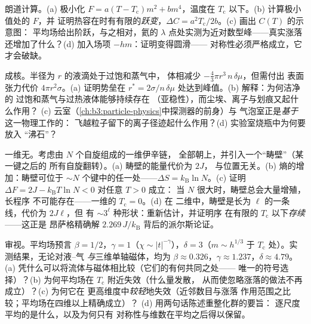 \begin{exercise}[$\star\star$]\label{exo:b3:phase-transitions:8}
朗道计算。(a) 极小化 $F = a(T - T_{\text{c}})m^2 +
bm^4$，温度在 $T_{\text{c}}$ 以下。(b) 计算极小值处的 $F$，并
证明热容在时有有限的\emph{跃变}，$\Delta C =
a^2T_{\text{c}}/2b$。(c) 画出 $C(T)$ 的示意图：
平均场给出阶跃，与之相对，氦的
$\lambda$ 点处实测为近对数型峰——真实涨落还增加了什么？(d)
加入场项 $-hm$：证明变得圆滑——
对称性必须严格成立，它才会破缺。
\end{exercise}

\begin{exercise}[$\star\star$]\label{exo:b3:phase-transitions:9}
成核。半径为 $r$ 的液滴处于过饱和蒸气中，
体相减少 $-\tfrac43\pi r^3\,n\,\delta\mu$，但需付出
表面张力代价 $4\pi r^2\sigma$。(a) 证明势垒在
$r^* = 2\sigma/n\,\delta\mu$ 处达到峰值。(b) 解释：为何洁净的
过饱和蒸气与过热液体能够持续存在
（亚稳性），而尘埃、离子与划痕又起什么作用？
(c) 云室（\cref{ch:b3:particle-physics}中探测器的前身）与
气泡室正是\emph{基于}这一物理工作的：
飞越粒子留下的离子径迹起什么作用？(d) 实验室烧瓶中为何要放入
“沸石”？
\end{exercise}

\begin{exercise}[$\star\star\star$]\label{exo:b3:phase-transitions:10}
一维无。考虑由 $N$ 个自旋组成的一维伊辛链，
全部朝上，并引入一个“畴壁”（某一键之后的
所有自旋翻转）。(a) 畴壁的能量代价为 $2J$，
与位置无关。(b) 熵的增加：畴壁可位于
$\sim N$ 个键中的任一处——$\Delta S = k_{\text{B}}\ln N$。(c)
证明 $\Delta F = 2J - k_{\text{B}}T\ln N < 0$ 对任意 $T > 0$ 成立：
当 $N$ 很大时，畴壁总会大量增殖，长程序
不可能存在——一维的 $T_{\text{c}} = 0$。(d) 在
二维中，畴壁是长为 $\ell$ 的一条线，代价为 $2J\ell$，但
有 $\sim3^\ell$ 种形状：重新估计，并证明序
在有限的 $T_{\text{c}}$ 以下\emph{存续}——这正是
昂萨格精确解 $2.269\,J/k_{\text{B}}$ 背后的派尔斯论证。
\end{exercise}

\begin{exercise}[$\star\star\star$]\label{exo:b3:phase-transitions:11}
审视。平均场预言 $\beta = 1/2$，$\gamma
= 1$（$\chi \sim |t|^{-\gamma}$），$\delta = 3$（$m \sim h^{1/3}$
于 $T_{\text{c}}$ 处）。实测结果，无论对液–气
\emph{与}三维单轴磁体，均为 $\beta
\approx 0.326$，$\gamma \approx 1.237$，$\delta \approx 4.79$。
(a) 凭什么可以将流体与磁体相比较（它们的有何共同之处——
唯一的符号选择）？(b)
为何平均场在 $T_{\text{c}}$ 附近失效（什么量发散，
从而使忽略涨落的做法不再成立）？(c) 为何它在
更高维度中\emph{较轻}地失效（近邻数目与涨落
作用范围之比较；平均场在四维以上精确成立）？
(d) 用两句话陈述重整化群的要旨：
逐尺度平均的是什么，以及为何只有
对称性与维数在平均之后得以保留。
\end{exercise}

